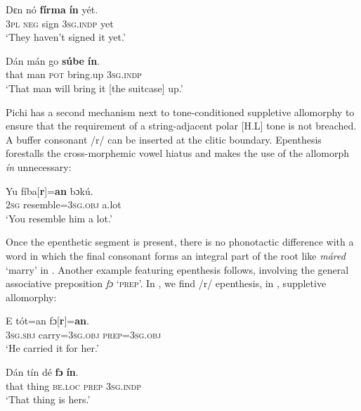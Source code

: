 \ea%
    \label{ex:key:70}
    \gll   Dɛn    nó    \textbf{fírma}  \textbf{ín}    yét.    \\
\textsc{3pl}    \textsc{neg}    sign    \textsc{3sg.indp}  yet\\


\glt ‘They haven't signed it yet.’\\

\z

\ea%
    \label{ex:key:71}
    \gll   Dán    mán    go  \textbf{súbe}  \textbf{ín}.\\
that    man    \textsc{pot}  bring.up  \textsc{3sg.indp}\\

\glt ‘That man will bring it [the suitcase] up.’
\z

Pichi has a second mechanism next to tone-conditioned suppletive allomorphy to ensure that the requirement of a string-adjacent polar [H.L] tone is not breached. A buffer consonant /r/ can be inserted at the clitic boundary. Epenthesis forestalls the cross-morphemic vowel hiatus and makes the use of the allomorph \textit{ín} unnecessary:


\ea%
    \label{ex:key:72}
    \gll   Yu  fíba[\textbf{r}]=\textbf{an}    bɔkú.\\
\textsc{2sg}  resemble=\textsc{3sg.obj}  a.lot\\

\glt ‘You resemble him a lot.’ 
\z

Once the epenthetic segment is present, there is no phonotactic difference with a word in which the final consonant forms an integral part of the root like \textit{máred} ‘marry’ in . Another example featuring epenthesis follows, involving the general associative preposition \textit{fɔ} ‘\textsc{prep}’. In , we find /r/ epenthesis, in , suppletive allomorphy:


\ea%
    \label{ex:key:73}
    \gll   E    tót=an    fɔ[\textbf{r}]=\textbf{an}.\\
\textsc{3sg.sbj}  carry=\textsc{3sg.obj}  \textsc{prep=3sg.obj}\\

\glt ‘He carried it for her.’
\z


\ea%
    \label{ex:key:74}
    \gll   Dán    tín    dé    \textbf{fɔ}  \textbf{ín}.\\
that    thing  \textsc{be.loc}  \textsc{prep}  \textsc{3sg.indp}\\

\glt ‘That thing is hers.’
\z

